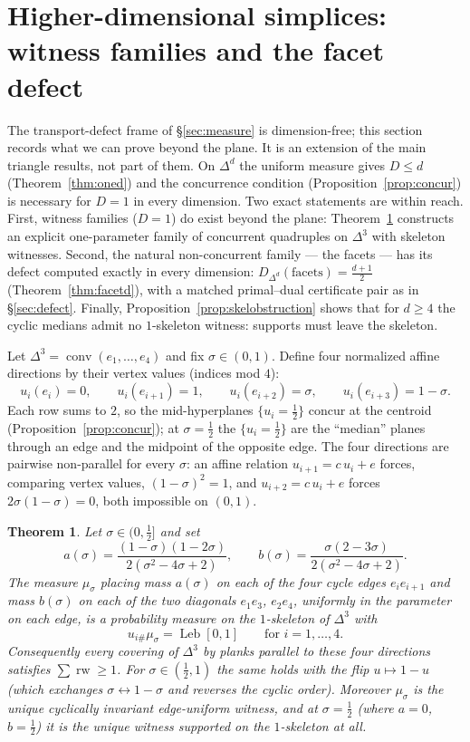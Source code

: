 \documentclass[11pt,reqno]{amsart}
\theoremstyle{plain}
\newtheorem{theorem}{Theorem}[section]
\theoremstyle{definition}
\theoremstyle{remark}
\newcommand{\rw}{\operatorname{rw}}
\newcommand{\Leb}{\operatorname{Leb}}
\begin{document}
\section{Higher-dimensional simplices: witness families and the facet
defect}\label{sec:simplex3}
The transport-defect frame of \S\ref{sec:measure} is dimension-free; this
section records what we can prove beyond the plane. It is an extension of the
main triangle results, not part of them. On $\Delta^d$ the uniform measure
gives $D\le d$ (Theorem~\ref{thm:oned}) and the concurrence condition
(Proposition~\ref{prop:concur}) is necessary for $D=1$ in every dimension.
Two exact statements are within reach. First, witness families ($D=1$) do
exist beyond the plane: Theorem~\ref{thm:simplex3} constructs an explicit
one-parameter family of concurrent quadruples on $\Delta^3$ with skeleton
witnesses. Second, the natural non-concurrent family --- the facets --- has
its defect computed exactly in every dimension:
$D_{\Delta^d}(\text{facets})=\tfrac{d+1}2$ (Theorem~\ref{thm:facetd}), with a
matched primal--dual certificate pair as in \S\ref{sec:defect}. Finally,
Proposition~\ref{prop:skelobstruction} shows that for $d\ge4$ the cyclic
medians admit no $1$-skeleton witness: supports must leave the skeleton.

Let $\Delta^3=\operatorname{conv}(e_1,\dots,e_4)$ and fix $\sigma\in(0,1)$.
Define four normalized affine directions by their vertex values (indices mod
$4$):
\begin{equation}\label{eq:sigma-family}
u_i(e_i)=0,\qquad u_i(e_{i+1})=1,\qquad u_i(e_{i+2})=\sigma,\qquad
u_i(e_{i+3})=1-\sigma .
\end{equation}
Each row sums to $2$, so the mid-hyperplanes $\{u_i=\tfrac12\}$ concur at the
centroid (Proposition~\ref{prop:concur}); at $\sigma=\tfrac12$ the
$\{u_i=\tfrac12\}$ are the ``median'' planes through an edge and the midpoint of
the opposite edge. The four directions are pairwise non-parallel for every
$\sigma$: an affine relation $u_{i+1}=c\,u_i+e$ forces, comparing vertex values,
$(1-\sigma)^2=1$, and $u_{i+2}=c\,u_i+e$ forces $2\sigma(1-\sigma)=0$, both
impossible on $(0,1)$.

\begin{theorem}\label{thm:simplex3}
Let $\sigma\in(0,\tfrac12]$ and set
\[
a(\sigma)=\frac{(1-\sigma)(1-2\sigma)}{2(\sigma^2-4\sigma+2)},\qquad
b(\sigma)=\frac{\sigma(2-3\sigma)}{2(\sigma^2-4\sigma+2)} .
\]
The measure $\mu_\sigma$ placing mass $a(\sigma)$ on each of the four cycle
edges $e_ie_{i+1}$ and mass $b(\sigma)$ on each of the two diagonals
$e_1e_3$, $e_2e_4$, uniformly in the parameter on each edge, is a probability
measure on the $1$-skeleton of $\Delta^3$ with
\[
u_{i\#}\mu_\sigma=\Leb[0,1]\qquad\text{for }i=1,\dots,4 .
\]
Consequently every covering of $\Delta^3$ by planks parallel to these four
directions satisfies $\sum\rw\ge1$. For $\sigma\in(\tfrac12,1)$ the same holds
with the flip $u\mapsto1-u$ (which exchanges $\sigma\leftrightarrow1-\sigma$ and
reverses the cyclic order). Moreover $\mu_\sigma$ is the unique cyclically
invariant edge-uniform witness, and at $\sigma=\tfrac12$ (where $a=0$,
$b=\tfrac12$) it is the unique witness supported on the $1$-skeleton at all.
\end{theorem}
\end{document}
